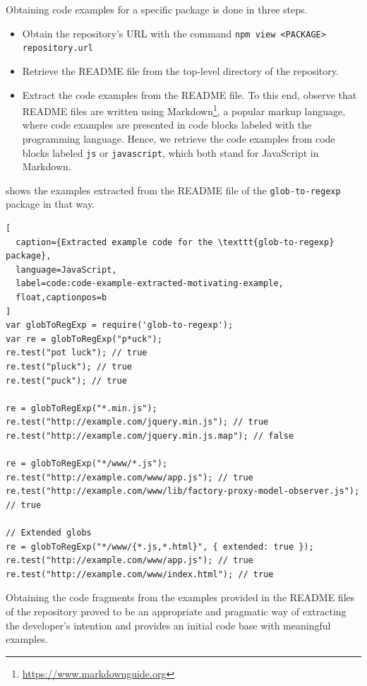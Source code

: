 \documentclass[sigconf]{acmart}
\begin{document}
Obtaining code examples for a specific \NPM{} package is done in three steps.
\begin{itemize}
\item Obtain the  repository's URL with the command
  \texttt{npm view <PACKAGE> repository.url}

\item Retrieve the README file from the top-level directory of the repository.

\item Extract the code examples from the README file. To this end,
  observe that README files are
  written using Markdown\footnote{\url{https://www.markdownguide.org}}, a
  popular markup language, where
  code examples are presented in code blocks labeled with the programming
  language. Hence, we
  retrieve the code examples from code blocks labeled \texttt{js} or
  \texttt{javascript}, which both stand for JavaScript in
  Markdown.
\end{itemize}

 shows
the examples extracted from  the README file of the \texttt{glob-to-regexp} package in
that way.

\begin{lstlisting}[
  caption={Extracted example code for the \texttt{glob-to-regexp} package},
  language=JavaScript,
  label=code:code-example-extracted-motivating-example,
  float,captionpos=b
]
var globToRegExp = require('glob-to-regexp');
var re = globToRegExp("p*uck");
re.test("pot luck"); // true
re.test("pluck"); // true
re.test("puck"); // true

re = globToRegExp("*.min.js");
re.test("http://example.com/jquery.min.js"); // true
re.test("http://example.com/jquery.min.js.map"); // false

re = globToRegExp("*/www/*.js");
re.test("http://example.com/www/app.js"); // true
re.test("http://example.com/www/lib/factory-proxy-model-observer.js"); // true

// Extended globs
re = globToRegExp("*/www/{*.js,*.html}", { extended: true });
re.test("http://example.com/www/app.js"); // true
re.test("http://example.com/www/index.html"); // true
\end{lstlisting}

Obtaining the code fragments from the examples provided in the
README files of the repository proved to be an
appropriate and pragmatic way of extracting the developer's
intention and provides an initial code base with meaningful
examples.
\end{document}
